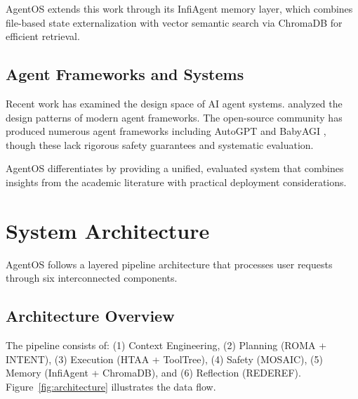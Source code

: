 \documentclass{article}
\begin{document}
AgentOS extends this work through its InfiAgent memory layer, which combines file-based state externalization with vector semantic search via ChromaDB for efficient retrieval.

\subsection{Agent Frameworks and Systems}

Recent work has examined the design space of AI agent systems. \citet{liu2026claudecode} analyzed the design patterns of modern agent frameworks. The open-source community has produced numerous agent frameworks including AutoGPT and BabyAGI \citep{autogpt2023, babyagi2023}, though these lack rigorous safety guarantees and systematic evaluation.

AgentOS differentiates by providing a unified, evaluated system that combines insights from the academic literature with practical deployment considerations.

\section{System Architecture}

AgentOS follows a layered pipeline architecture that processes user requests through six interconnected components.

\subsection{Architecture Overview}

The pipeline consists of: (1) Context Engineering, (2) Planning (ROMA + INTENT), (3) Execution (HTAA + ToolTree), (4) Safety (MOSAIC), (5) Memory (InfiAgent + ChromaDB), and (6) Reflection (REDEREF). Figure~\ref{fig:architecture} illustrates the data flow.
\end{document}
